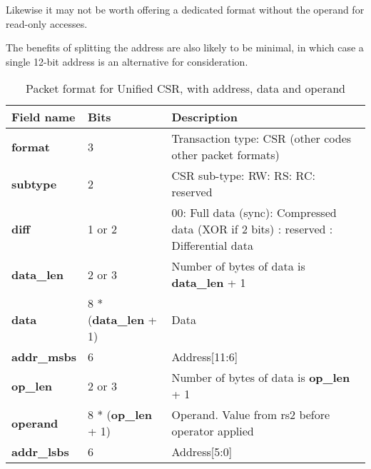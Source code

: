 Likewise it may not be worth offering a dedicated format without the operand for read-only accesses.

The benefits of splitting the address are also likely to be minimal, in which case
a single 12-bit address is an alternative for consideration.

\begin{table}[htp]
  \centering
  \caption{Packet format for Unified CSR, with address, data and operand}
  \label{tab:te_datadx0y10}
  \begin{tabulary}{\textwidth}{|l|p{40mm}|p{90mm}|}
    \hline
    {\bf Field name} & {\bf Bits} & {\bf Description} \\
    \hline
    \textbf{format} & 	3	& Transaction type: CSR\newline
		(other codes other packet formats)\\
    \hline
    \textbf{subtype} & 	2	& CSR sub-type: RW: RS: RC: reserved\\	
    \hline
    \textbf{diff} & 1 or 2 & 00: Full data (sync): Compressed data (XOR if 2 bits) : reserved : Differential data\\
    \hline
    \textbf{data\_len}	& 2 or 3 & Number of bytes of data is \textbf{data\_len} + 1\\
    \hline
    \textbf{data} & 8 * (\textbf{data\_len} + 1) & Data\\
    \hline
    \textbf{addr\_msbs} & 6  &	Address[11:6]\\
    \hline
    \textbf{op\_len} & 2 or 3  & Number of bytes of data is \textbf{op\_len} + 1\\    
    \hline
    \textbf{operand}	& 8 * (\textbf{op\_len} + 1) & Operand.  Value from rs2 before operator applied\\
    \hline
    \textbf{addr\_lsbs} &  6 & Address[5:0] \\
    \hline
  \end{tabulary}
\end{table}

